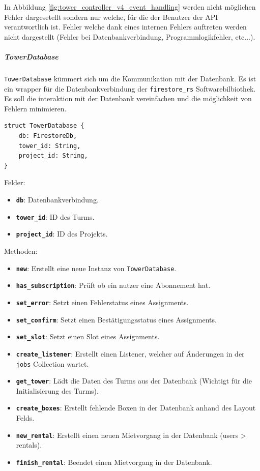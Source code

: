 In Abbildung \ref{fig:tower_controller_v4_event_handling} werden nicht möglichen Fehler dargesetellt sondern nur welche, für die der Benutzer der API verantwortlich ist. Fehler welche dank eines internen Fehlers auftreten werden nicht dargestellt (Fehler bei Datenbankverbindung, Programmlogikfehler, etc...).

\subparagraph{TowerDatabase}

\texttt{TowerDatabase} kümmert sich um die Kommunikation mit der Datenbank. Es ist ein \Gls{wrapper} für die Datenbankverbindung der \texttt{firestore\_rs} Softwarebilbiothek. Es soll die interaktion mit der Datenbank vereinfachen und die möglichkeit von Fehlern minimieren.

\begin{verbatim}
struct TowerDatabase {
    db: FirestoreDb,
    tower_id: String,
    project_id: String,
}
\end{verbatim}

Felder:
\begin{itemize}
  \item \textbf{\texttt{db}}: Datenbankverbindung.
  \item \textbf{\texttt{tower\_id}}: ID des Turms.
  \item \textbf{\texttt{project\_id}}: ID des Projekts.
\end{itemize}

Methoden:
\begin{itemize}
  \item \textbf{\texttt{new}}: Erstellt eine neue Instanz von \texttt{TowerDatabase}.
  \item \textbf{\texttt{has\_subscription}}: Prüft ob ein nutzer eine Abonnement hat.
  \item \textbf{\texttt{set\_error}}: Setzt einen Fehlerstatus eines Assignments.
  \item \textbf{\texttt{set\_confirm}}: Setzt einen Bestätigungsstatus eines Assignments.
  \item \textbf{\texttt{set\_slot}}: Setzt einen Slot eines Assignments.
  \item \textbf{\texttt{create\_listener}}: Erstellt einen Listener, welcher auf Änderungen in der \texttt{jobs} Collection wartet.
  \item \textbf{\texttt{get\_tower}}: Lädt die Daten des Turms aus der Datenbank (Wichtigt für die Initialisierung des Turms).
  \item \textbf{\texttt{create\_boxes}}: Erstellt fehlende Boxen in der Datenbank anhand des Layout Felds.
  \item \textbf{\texttt{new\_rental}}: Erstellt einen neuen Mietvorgang in der Datenbank (users > rentals).
  \item \textbf{\texttt{finish\_rental}}: Beendet einen Mietvorgang in der Datenbank.
\end{itemize}


